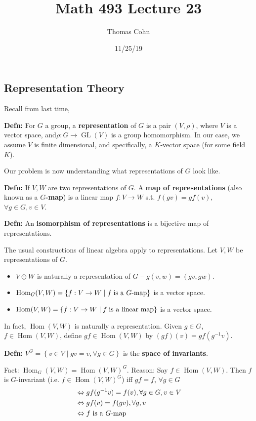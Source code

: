 \documentclass[10pt,letterpaper]{article}
\author{Thomas Cohn}
\title{Math 493 Lecture 23}
\date{11/25/19} %
\newcommand{\n}{\hfill\break}
\newcommand{\hangblock}[2]{\par\noindent\settowidth{\hangindent}{\textbf{#1: }}\textbf{#1: }\!\!\!#2}
\newcommand{\defn}[1]{\hangblock{Defn}{#1}}
\newcommand{\ptxt}[1]{\textrm{\textnormal{#1}}}
\newcommand{\set}[1]{\left\{#1\right\}}
\DeclareMathOperator{\Hom}{Hom}
\newcommand{\inv}{^{-1}}
\DeclareMathOperator{\GL}{GL}
\newcommand{\st}{s.t.}
\begin{document}
\maketitle
\setlength\RaggedRightParindent{\parindent}
\RaggedRight

\subsection*{Representation Theory}

\par\noindent
Recall from last time,\n

\defn{
	For $G$ a group, a \textbf{representation} of $G$ is a pair $(V,\rho)$, where $V$ is a vector space, and\break $\rho:G\to\GL(V)$ is a group homomorphism. In our case, we assume $V$ is finite dimensional, and specifically, a $K$-vector space (for some field $K$).\n
}

\par\noindent
Our problem is now understanding what representations of $G$ look like.\n

\defn{
	If $V,W$ are two representations of $G$. A \textbf{map of representations} (also known as a \textbf{$G$-map}) is a linear map $f:V\to{}W$ \st{} $f(gv)=gf(v)$, $\forall{}g\in{}G,v\in{}V$.\n
}

\defn{
	An \textbf{isomorphism of representations} is a bijective map of representations.\n
}

\par\noindent
The usual constructions of linear algebra apply to representations. Let $V,W$ be representations of $G$.
\begin{itemize}
	\item $V\oplus{}W$ is naturally a representation of $G$ -- $g(v,w)=(gv,gw)$.
	\item $\Hom_{G}(V,W)=\set{f:V\to{}W\mid{}f\;\ptxt{is a $G$-map}}$ is a vector space.
	\item $\Hom(V,W)=\set{f:V\to{}W\mid{}f\;\ptxt{is a linear map}}$ is a vector space.
\end{itemize}

\par\noindent
In fact, $\Hom(V,W)$ is naturally a representation. Given $g\in{}G$, $f\in\Hom(V,W)$, define $gf\in\Hom(V,W)$ by $(gf)(v)=gf(g\inv{}v)$.\n

\defn{
	$V^{G}=\set{v\in{}V\mid{}gv=v,\forall{}g\in{}G}$ is the \textbf{space of invariants}.\n
}

\par\noindent
Fact: $\Hom_{G}(V,W)=\Hom(V,W)^{G}$.\n
Reason: Say $f\in\Hom(V,W)$. Then $f$ is $G$-invariant (i.e. $f\in\Hom(V,W)^{G}$) iff $gf=f$, $\forall{}g\in{}G$
{\setlength{\abovedisplayskip}{0pt}
\begin{align*}
	& \Leftrightarrow{}gf(g\inv{}v)=f(v),\forall{}g\in{}G,v\in{}V\\
	& \Leftrightarrow{}gf(v)=f(gv),\forall{}g,v\\
	& \Leftrightarrow{}f\ptxt{ is a $G$-map}
\end{align*}}
\end{document}

